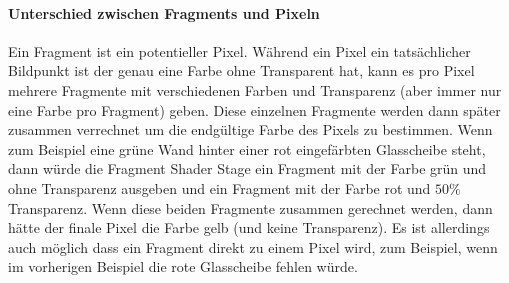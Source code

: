 \paragraph{Unterschied zwischen Fragments und Pixeln}
Ein Fragment ist ein potentieller Pixel. Während ein Pixel ein tatsächlicher Bildpunkt ist der genau eine Farbe ohne Transparent hat, kann es pro Pixel mehrere Fragmente mit verschiedenen Farben und Transparenz (aber immer nur eine Farbe pro Fragment) geben. Diese einzelnen Fragmente werden dann später zusammen verrechnet um die endgültige Farbe des Pixels zu bestimmen. Wenn zum Beispiel eine grüne Wand hinter einer rot eingefärbten Glasscheibe steht, dann würde die Fragment Shader Stage ein Fragment mit der Farbe grün und ohne Transparenz ausgeben und ein Fragment mit der Farbe rot und $50\%$ Transparenz. Wenn diese beiden Fragmente zusammen gerechnet werden, dann hätte der finale Pixel die Farbe gelb (und keine Transparenz). Es ist allerdings auch möglich dass ein Fragment direkt zu einem Pixel wird, zum Beispiel, wenn im vorherigen Beispiel die rote Glasscheibe fehlen würde.
